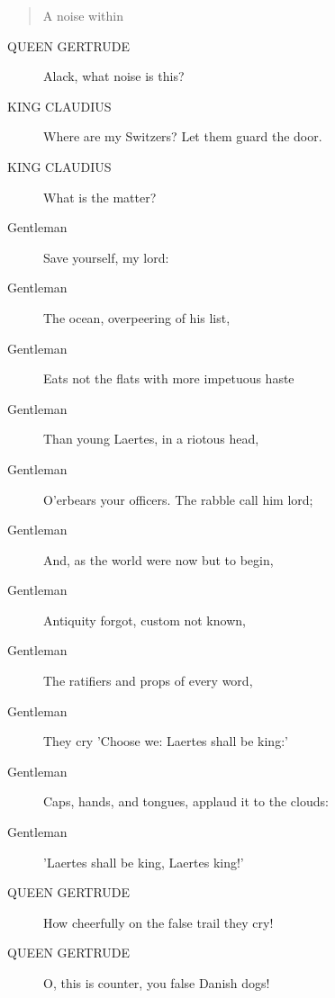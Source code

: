 \documentclass{article}
\begin{document}
\begin{quote}
A noise within
\end{quote}
          
\begin{description}
            
\item[QUEEN GERTRUDE] Alack, what noise is this?
\end{description}
          
\begin{description}
            
\item[KING CLAUDIUS] Where are my Switzers? Let them guard the door.
\item[KING CLAUDIUS] What is the matter?
\end{description}
          
\begin{description}
            
\item[Gentleman] Save yourself, my lord:
\item[Gentleman] The ocean, overpeering of his list,
\item[Gentleman] Eats not the flats with more impetuous haste
\item[Gentleman] Than young Laertes, in a riotous head,
\item[Gentleman] O'erbears your officers. The rabble call him lord;
\item[Gentleman] And, as the world were now but to begin,
\item[Gentleman] Antiquity forgot, custom not known,
\item[Gentleman] The ratifiers and props of every word,
\item[Gentleman] They cry 'Choose we: Laertes shall be king:'
\item[Gentleman] Caps, hands, and tongues, applaud it to the clouds:
\item[Gentleman] 'Laertes shall be king, Laertes king!'
\end{description}
          
\begin{description}
            
\item[QUEEN GERTRUDE] How cheerfully on the false trail they cry!
\item[QUEEN GERTRUDE] O, this is counter, you false Danish dogs!
\end{description}
          
\end{document}
